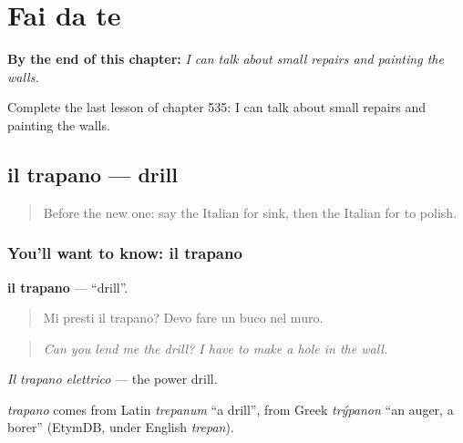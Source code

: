 
\chapter{Fai da te}
\label{ch:it-fai-da-te}

\begin{chapteropening}
\textbf{By the end of this chapter:} \emph{I can talk about small repairs and painting the walls.}

Complete the last lesson of chapter 535: I can talk about small repairs and painting the walls.
\end{chapteropening}

\section[il trapano]{il trapano — drill}

\label{lesson:IT-C535-trapano}



\begin{quote}
Before the new one: say the Italian for sink, then the Italian for to polish.
\end{quote}

\subsection*{You'll want to know: il trapano}
\textbf{il trapano} — \textquotedblleft{}drill\textquotedblright{}.

\begin{quote}
Mi presti il trapano? Devo fare un buco nel muro.
\end{quote}

\begin{quote}
\emph{Can you lend me the drill? I have to make a hole in the wall.}
\end{quote}

\emph{Il trapano elettrico} — the power drill.

\begin{cousinweb}
\emph{trapano} comes from Latin \emph{trepanum} \textquotedblleft{}a drill\textquotedblright{}, from Greek \emph{trýpanon} \textquotedblleft{}an auger, a borer\textquotedblright{} (EtymDB, under English \emph{trepan}).
\end{cousinweb}

